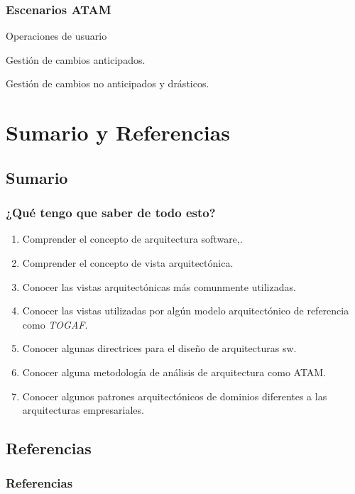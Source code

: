﻿\documentclass[handout,a4paper,slidestop,xcolor=pst,blue]{beamer}
\begin{document}
\begin{frame}[c]
	\frametitle{Escenarios ATAM}
	\begin{description}
		\item<+->[Casos de Uso] Operaciones de usuario
		\item<+->[Crecimiento] Gestión de cambios anticipados.
		\item<+->[Exploratorios]  Gestión de cambios no anticipados y drásticos.
	\end{description}
\end{frame}


\section{Sumario y Referencias}

\subsection{Sumario}

\begin{frame}[c]
	\frametitle{¿Qué tengo que saber de todo esto?}
	\begin{enumerate}[<+->]
		\item Comprender el concepto de arquitectura software,.
		\item Comprender el concepto de vista arquitectónica.
		\item Conocer las vistas arquitectónicas más comunmente utilizadas.
		\item Conocer las vistas utilizadas por algún modelo arquitectónico de referencia como \emph{TOGAF}.
        \item Conocer algunas directrices para el diseño de arquitecturas sw.
        \item Conocer alguna metodología de análisis de arquitectura como ATAM.
        \item Conocer algunos patrones arquitectónicos de dominios diferentes a las arquitecturas empresariales.
	\end{enumerate}
\end{frame}

\subsection{Referencias}

\begin{frame}[allowframebreaks]
	\frametitle{Referencias}
	
	
\end{frame}
\end{document}
